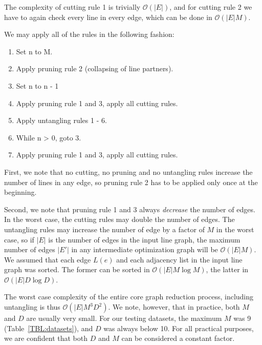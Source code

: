 \documentclass[format=acmsmall, review=false, screen=true]{acmart}
\begin{document}
The complexity of cutting rule 1 is trivially $\mathcal{O}(|E|)$, and for cutting rule 2 we have to again check every line in every edge, which can be done in $\mathcal{O}(|E|M)$.

We may apply all of the rules in the following fashion:

\begin{enumerate}
  \item Set n to M.
  \item Apply pruning rule 2 (collapsing of line partners).
  \item Set n to n - 1
  \item Apply pruning rule 1 and 3, apply all cutting rules.
  \item Apply untangling rules 1 - 6.
  \item While n > 0, goto 3.
  \item Apply pruning rule 1 and 3, apply all cutting rules.
\end{enumerate}

First, we note that no cutting, no pruning and no untangling rules increase the number of lines in any edge, so pruning rule 2 has to be applied only once at the beginning.

Second, we note that pruning rule 1 and 3 always \emph{decrease} the number of edges. In the worst case, the cutting rules may double the number of edges. The untangling rules may increase the number of edge by a factor of $M$ in the worst case, so if $|E|$ is the number of edges in the input line graph, the maximum number of edges $|E'|$ in any intermediate optimization graph will be $\mathcal{O}(|E|M)$. We assumed that each edge $L(e)$ and each adjacency list in the input line graph was sorted. The former can be sorted in $\mathcal{O}(|E|M\log M)$, the latter in $\mathcal{O}(|E|D\log D)$.

The worst case complexity of the entire core graph reduction process, including untangling is thus $\mathcal{O}(|E|M^3D^2)$. We note, however, that in practice, both $M$ and $D$ are usually very small. For our testing datasets, the maximum $M$ was 9 (Table~\ref{TBL:datasets}), and $D$ was always below 10. For all practical purposes, we are confident that both $D$ and $M$ can be considered a constant factor.

%
\end{document}
